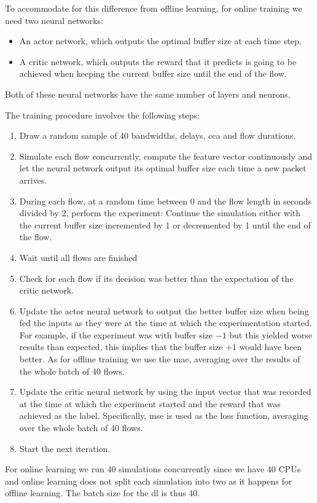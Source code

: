 \documentclass[conference]{IEEEtran}
\begin{document}
To accommodate for this difference from offline learning, for online training we need two neural networks: 
\begin{itemize}
\item An actor network, which outputs the optimal buffer size at each time step.
\item A critic network, which outputs the reward that it predicts is going to be achieved when keeping the current buffer size until the end of the flow. 
\end{itemize}
Both of these neural networks have the same number of layers and neurons. 

The training procedure involves the following steps:
\begin{enumerate}
\item Draw a random sample of 40 bandwidths, delays, \gls{cca} and flow durations.
\item Simulate each flow concurrently, compute the feature vector continuously and let the neural network output its optimal buffer size each time a new packet arrives. 
\item During each flow, at a random time between 0 and the flow length in seconds divided by 2, perform the experiment: Continue the simulation either with the current buffer size incremented by 1 or decremented by 1 until the end of the flow.
\item Wait until all flows are finished
\item Check for each flow if its decision was better than the expectation of the critic network.
\item Update the actor neural network to output the better buffer size when being fed the inputs as they were at the time at which the experimentation started. For example, if the experiment was with buffer size $-1$ but this yielded worse results than expected, this implies that the buffer size $+1$ would have been better. As for offline training we use the \gls{mae}, averaging over the results of the whole batch of 40 flows. 
\item Update the critic neural network by using the input vector that was recorded at the time at which the experiment started and the reward that was achieved as the label. Specifically, \gls{mse} is used as the loss function, averaging over the whole batch of 40 flows. 
\item Start the next iteration. 
\end{enumerate}

For online learning we run 40 simulations concurrently since we have 40 CPUs and online learning does not split each simulation into two as it happens for offline learning. The batch size for the \gls{dl} is thus 40. 
\end{document}
